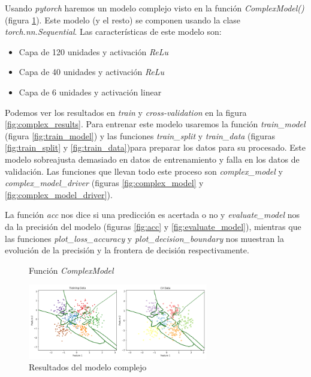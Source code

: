 \documentclass[6pt]{../../shared/AiTex}
\begin{document}
Usando \textit{pytorch} haremos un modelo complejo visto en la función \textit{ComplexModel()} (figura \ref{fig:ComplexModel}). Este modelo (y el resto) se componen usando la clase \textit{torch.nn.Sequential}. Las características de este modelo son:
\begin{itemize}
    \item Capa de 120 unidades y activación \textit{ReLu}
    \item Capa de 40 unidades y activación \textit{ReLu}
    \item Capa de 6 unidades y activación linear
\end{itemize}

Podemos ver los resultados en \textit{train} y \textit{cross-validation} en la figura \ref{fig:complex_results}. Para entrenar este modelo usaremos la función \textit{train\_model} (figura \ref{fig:train_model}) y las funciones \textit{train\_split} y \textit{train\_data}  (figuras \ref{fig:train_split} y \ref{fig:train_data})para preparar los datos para su procesado. Este modelo sobreajusta demasiado en datos de entrenamiento y falla en los datos de validación. Las funciones que llevan todo este proceso son \textit{complex\_model} y \textit{complex\_model\_driver} (figuras \ref{fig:complex_model} y \ref{fig:complex_model_driver}).

La función \textit{acc} nos dice si una predicción es acertada o no y \textit{evaluate\_model} nos da la precisión del modelo (figuras \ref{fig:acc} y \ref{fig:evaluate_model}), mientras que las funciones \textit{plot\_loss\_accuracy} y \textit{plot\_decision\_boundary} nos muestran la evolución de la precisión y la frontera de decisión respectivamente.

\begin{figure}[H]
    \centering
    
    \caption{Función \textit{ComplexModel}}
    \label{fig:ComplexModel}
\end{figure}

\begin{figure}[H]
    \centering
    \includegraphics[width=0.7\textwidth]{./images/decision_boundary_complex.png}
    \caption{Resultados del modelo complejo}
\end{figure}
\end{document}
